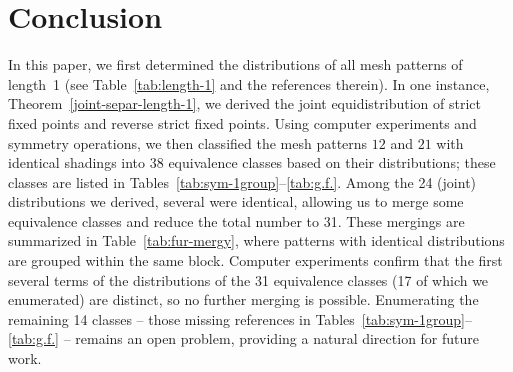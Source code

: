 \documentclass[12pt]{article}
\begin{document}
\section{Conclusion}
In this paper, we first determined the distributions of all mesh patterns of length~1 (see Table~\ref{tab:length-1} and the references therein). In one instance, Theorem~\ref{joint-separ-length-1}, we derived the joint equidistribution of strict fixed points and reverse strict fixed points. Using computer experiments and symmetry operations, we then classified the mesh patterns $12$ and $21$ with identical shadings into 38 equivalence classes based on their distributions; these classes are listed in Tables~\ref{tab:sym-1group}--\ref{tab:g.f.}. Among the 24 (joint) distributions we derived, several were identical, allowing us to merge some equivalence classes and reduce the total number to 31. These mergings are summarized in Table~\ref{tab:fur-mergy}, where patterns with identical distributions are grouped within the same block. Computer experiments confirm that the first several terms of the distributions of the 31 equivalence classes (17 of which we enumerated) are distinct, so no further merging is possible. Enumerating the remaining 14 classes -- those missing references in Tables~\ref{tab:sym-1group}--\ref{tab:g.f.} -- remains an open problem, providing a natural direction for future work.
\end{document}
